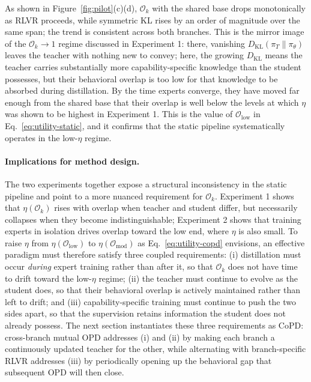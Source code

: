 \documentclass{llmxive}
\begin{document}
As shown in Figure~\ref{fig:pilot}(c)(d), $\mathcal{O}_k$ with the shared base drops monotonically as RLVR proceeds, while symmetric KL rises by an order of magnitude over the same span; the trend is consistent across both branches. This is the mirror image of the $\mathcal{O}_k \to 1$ regime discussed in Experiment 1: there, vanishing $D_{\mathrm{KL}}(\pi_T \| \pi_\theta)$ leaves the teacher with nothing new to convey; here, the growing $D_{\mathrm{KL}}$ means the teacher carries substantially more capability-specific knowledge than the student possesses, but their behavioral overlap is too low for that knowledge to be absorbed during distillation. By the time experts converge, they have moved far enough from the shared base that their overlap is well below the levels at which $\eta$ was shown to be highest in Experiment 1. This is the value of $\mathcal{O}_{\text{low}}$ in Eq.~\eqref{eq:utility-static}, and it confirms that the static pipeline systematically operates in the low-$\eta$ regime.


\paragraph{Implications for method design.}
The two experiments together expose a structural inconsistency in the static pipeline and point to a more nuanced requirement for $\mathcal{O}_k$. Experiment 1 shows that $\eta(\mathcal{O}_k)$ rises with overlap when teacher and student differ, but necessarily collapses when they become indistinguishable; Experiment 2 shows that training experts in isolation drives overlap toward the low end, where $\eta$ is also small. To raise $\eta$ from $\eta(\mathcal{O}_{\text{low}})$ to $\eta(\mathcal{O}_{\text{mod}})$ as Eq.~\eqref{eq:utility-copd} envisions, an effective paradigm must therefore satisfy three coupled requirements: (i) distillation must occur \emph{during} expert training rather than after it, so that $\mathcal{O}_k$ does not have time to drift toward the low-$\eta$ regime; (ii) the teacher must continue to evolve as the student does, so that their behavioral overlap is actively maintained rather than left to drift; and (iii) capability-specific training must continue to push the two sides apart, so that the supervision retains information the student does not already possess. The next section instantiates these three requirements as CoPD: cross-branch mutual OPD addresses (i) and (ii) by making each branch a continuously updated teacher for the other, while alternating with branch-specific RLVR addresses (iii) by periodically opening up the behavioral gap that subsequent OPD will then close.
\end{document}
